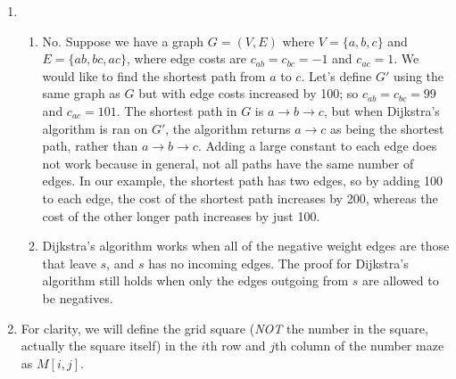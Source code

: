 \documentclass{article}
\begin{document}
\begin{enumerate}
%
%
\item
\begin{enumerate}
\item  No. Suppose we have a graph $G = (V, E)$ where $V = \{a, b, c\}$ and $E = \{ab, bc, ac\}$, where edge costs are $c_{ab} = c_{bc} = -1$ and $c_{ac} = 1$. We would like to find the shortest path from $a$ to $c$. Let's define $G'$ using the same graph as $G$ but with edge costs increased by 100; so $c_{ab} = c_{bc} = 99$ and $c_{ac} = 101$. The shortest path in $G$ is $a \rightarrow b \rightarrow c$, but when Dijkstra's algorithm is ran on $G'$, the algorithm returns $a \rightarrow c$ as being the shortest path, rather than $a \rightarrow b \rightarrow c$. Adding a large constant to each edge does not work because in general, not all paths have the same number of edges. In our example, the shortest path has two edges, so by adding 100 to each edge, the cost of the shortest path increases by 200, whereas the cost of the other longer path increases by just 100.

\item Dijkstra's algorithm works when all of the negative weight edges are those that leave $s$, and $s$ has no incoming edges. The proof for Dijkstra's algorithm still holds when only the edges outgoing from $s$ are allowed to be negatives.
\end{enumerate}

%
%
\item For clarity, we will define the grid square (\textit{NOT} the number in the square, actually the square itself) in the $i$th row and $j$th column of the number maze as $M[i, j]$.


\end{enumerate}
\end{document}
